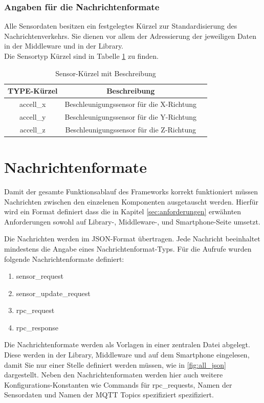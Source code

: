 \documentclass[11pt,a4paper]{report}
\begin{document}
\subsection*{Angaben für die Nachrichtenformate}
Alle Sensordaten besitzen ein festgelegtes Kürzel zur Standardisierung des Nachrichtenverkehrs.
Sie dienen vor allem der Adressierung der jeweiligen Daten in der Middleware und in der Library.
\\
Die Sensortyp Kürzel sind in Tabelle \ref{tab:sensor_types} zu finden. 
\begin{table}[htbp]
  \centering
  \begin{tabular}{|c|c|c}
      \hline
      TYPE-Kürzel & Beschreibung \\
      \hline
      accell\_x & Beschleunigungssensor für die X-Richtung \\
      \hline
      accell\_y & Beschleunigungssensor für die Y-Richtung \\
      \hline
      accell\_z & Beschleunigungssensor für die Z-Richtung \\
      \hline

  \end{tabular}
  \caption{Sensor-Kürzel mit Beschreibung}
  \label{tab:sensor_types}
\end{table}



\chapter*{Nachrichtenformate}
Damit der gesamte Funktionsablauf des Frameworks korrekt funktioniert müssen Nachrichten zwischen den einzelenen Komponenten ausgetauscht werden.
Hierfür wird ein Format definiert dass die in Kapitel \ref{sec:anforderungen} erwähnten Anforderungen sowohl auf Library-, Middleware-, und Smartphone-Seite umsetzt.

Die Nachrichten werden im JSON-Format übertragen.
Jede Nachricht beeinhaltet mindestens die Angabe eines Nachrichtenformat-Typs.
Für die Aufrufe wurden folgende Nachrichtenformate definiert:
\begin{enumerate}
  \item sensor\_request
  \item sensor\_update\_request
  \item rpc\_request
  \item rpc\_response
\end{enumerate}
Die Nachrichtenformate werden als Vorlagen in einer zentralen Datei abgelegt.
Diese werden in der Library, Middleware und auf dem Smartphone eingelesen, damit Sie nur einer Stelle definiert werden müssen, wie in \ref*{fig:all_json} dargestellt.
Neben den Nachrichtenformaten werden hier auch weitere Konfigurations-Konstanten wie Commands für rpc\_requests, Namen der Sensordaten und Namen der MQTT Topics spezifiziert spezifiziert.
\end{document}
